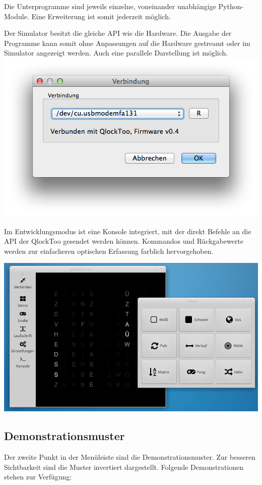 \begin{multicols}{2}
Die Unterprogramme sind jeweils einzelne, voneinander unabhängige Python-Module. Eine Erweiterung ist somit jederzeit möglich.

Der Simulator besitzt die gleiche API wie die Hardware. Die Ausgabe der Programme kann somit ohne Anpassungen auf die Hardware gestreamt oder im Simulator angezeigt werden. Auch eine parallele Darstellung ist möglich.
\includegraphics[width=\columnwidth]{Abbildungen/Software/ConnectDialog}

Im Entwicklungsmodus ist eine Konsole integriert, mit der direkt Befehle an die API der QlockToo gesendet werden können. Kommandos und Rückgabewerte werden zur einfacheren optischen Erfassung farblich hervorgehoben.

{
    \centering
    \includegraphics[width=0.85\columnwidth]{Abbildungen/Software/Linux}
}


\subsection{Demonstrationsmuster}
Der zweite Punkt in der Menüleiste sind die Demonstrationsmuster. Zur besseren Sichtbarkeit sind die Muster invertiert dargestellt. Folgende Demonstrationen stehen zur Verfügung:


\end{multicols}
